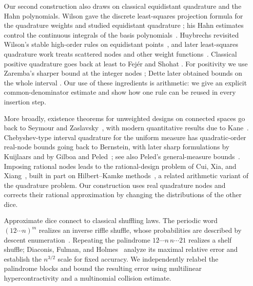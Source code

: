 \documentclass[11pt]{article}
\theoremstyle{definition}
\theoremstyle{remark}
\begin{document}
Our second construction also draws on classical equidistant quadrature and
the Hahn polynomials.  Wilson gave the discrete least-squares projection
formula for the quadrature weights and studied equidistant quadrature
\cite{wilson-algorithm,wilson-least-squares,wilson-quadrature}; his Hahn
estimates control the continuous integrals of the basis
polynomials~\cite{wilson-hahn}.  Huybrechs revisited Wilson's stable
high-order rules on equidistant points~\cite{huybrechs2009}, and later
least-squares quadrature work treats scattered nodes and other weight
functions~\cite{glaubitz2020,cappellazzo-et-al2023}.  Classical positive
quadrature goes back at least to Fej\'er and Shohat
\cite{fejer1933,shohat1937}.  For
positivity we use Zaremba's sharper bound at the integer nodes
\cite{zaremba1975}; Dette later obtained bounds on the whole interval
\cite{dette1995}.  Our use of these ingredients is arithmetic: we give an
explicit common-denominator estimate and show how one rule can be reused in
every insertion step.

More broadly, existence theorems for unweighted designs on connected spaces
go back to Seymour and Zaslavsky~\cite{seymour-zaslavsky1984}, with modern
quantitative results due to Kane~\cite{kane2015}.  Chebyshev-type interval
quadrature for the uniform measure has quadratic-order real-node bounds going
back to Bernstein, with later sharp formulations by Kuijlaars and by Gilboa
and Peled~\cite{bernstein1937,kuijlaars1993,kuijlaars1995,gilboa2017}; see also Peled's
general-measure bounds~\cite{peled2010}.  Imposing rational nodes leads to the
rational-design problem of Cui, Xia, and Xiang~\cite{cui2019}, built in part
on Hilbert--Kamke methods~\cite{arkhipov1985}, a related arithmetic variant of the quadrature problem.  Our construction
uses real quadrature nodes and corrects their rational approximation by
changing the distributions of the other dice.

Approximate dice connect to classical shuffling laws. The periodic word
\((12\cdots n)^m\) realizes an inverse riffle shuffle, whose probabilities
are described by descent enumeration~\cite{stanley1972,bayer-diaconis1992}.
Repeating the palindrome \(12\cdots n\,n\cdots21\) realizes a shelf
shuffle; Diaconis, Fulman, and Holmes~\cite{diaconis-fulman-holmes2013}
analyze its maximal relative error and establish the \(n^{3/2}\) scale for
fixed accuracy. We independently relabel the palindrome blocks and bound
the resulting error using multilinear hypercontractivity
\cite{bonami1970,odonnell2014} and a multinomial collision estimate.
\end{document}
